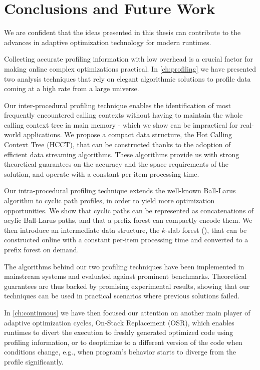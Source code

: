\chapter{Conclusions and Future Work}
\label{ch:conclusions}

We are confident that the ideas presented in this thesis can contribute to the advances in adaptive optimization technology for modern runtimes.

Collecting accurate profiling information with low overhead is a crucial factor for making online complex optimizations practical. In \mychapter\ref{ch:profiling} we have presented two analysis techniques that rely on elegant algorithmic solutions to profile data coming at a high rate from a large universe.

Our inter-procedural profiling technique enables the identification of most frequently encountered calling contexts without having to maintain the whole calling context tree in main memory - which we show can be impractical for real-world applications. We propose a compact data structure, the Hot Calling Context Tree (HCCT), that can be constructed thanks to the adoption of efficient data streaming algorithms. These algorithms provide us with strong theoretical guarantees on the accuracy and the space requirements of the solution, and operate with a constant per-item processing time.

Our intra-procedural profiling technique extends the well-known Ball-Larus algorithm to cyclic path profiles, in order to yield more optimization opportunities. We show that cyclic paths can be represented as concatenations of acylic Ball-Larus paths, and that a prefix forest can compactly encode them. We then introduce an intermediate data structure, the $k$-slab forest (\ksf), that can be constructed online with a constant per-item processing time and converted to a prefix forest on demand.

The algorithms behind our two profiling techniques have been implemented in mainstream systems and evaluated against prominent benchmarks. Theoretical guarantees are thus backed by promising experimental results, showing that our techniques can be used in practical scenarios where previous solutions failed.

In \mychapter\ref{ch:continuous} we have then focused our attention on another main player of adaptive optimization cycles, On-Stack Replacement (OSR), which enables runtimes to divert the execution to freshly generated optimized code using profiling information, or to deoptimize to a different version of the code when conditions change, e.g., when program's behavior starts to diverge from the profile significantly.

